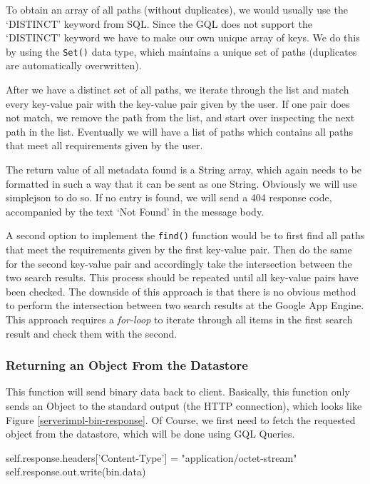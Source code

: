 To obtain an array of all paths (without duplicates), we would usually use the
`DISTINCT' keyword from SQL. Since the GQL does not support the `DISTINCT'
keyword we have to make our own unique array of keys. We do this by using the
\texttt{Set()} data type, which maintains a unique set of paths (duplicates are
automatically overwritten).

After we have a distinct set of all paths, we iterate through the list and
match every key-value pair with the key-value pair given by the user. If one
pair does not match, we remove the path from the list, and start over
inspecting the next path in the list. Eventually we will have a list of paths
which contains all paths that meet all requirements given by the user. 

The return value of all metadata found is a String array, which again needs to be
formatted in such a way that it can be sent as one String. Obviously we will
use simplejson to do so. If no entry is found, we will send a 404 response
code, accompanied by the text `Not Found' in the message body.

A second option to implement the \texttt{find()} function would be to first
find all paths that meet the requirements given by the first key-value pair.
Then do the same for the second key-value pair and accordingly take the
intersection between the two search results. This process should be repeated
until all key-value pairs have been checked. The downside of this approach is
that there is no obvious method to perform the intersection between two search
results at the Google App Engine. This approach requires a \emph{for-loop} to
iterate through all items in the first search result and check them with the
second. 

\subsubsection{Returning an Object From the Datastore}
This function will send binary data back to client. Basically, this function only
sends an Object to the standard output (the HTTP connection), which looks like
Figure \ref{serverimpl-bin-response}. Of Course, we first need to fetch the
requested object from the datastore, which will be done using GQL Queries. 

\begin{figure*}[ht] %
\begin{center}
\begin{code}
self.response.headers['Content-Type'] = "application/octet-stream"
self.response.out.write(bin.data)
\end{code}
\caption{HTTP Response with Binary Data.\label{serverimpl-bin-response}}
\end{center}
\end{figure*}

